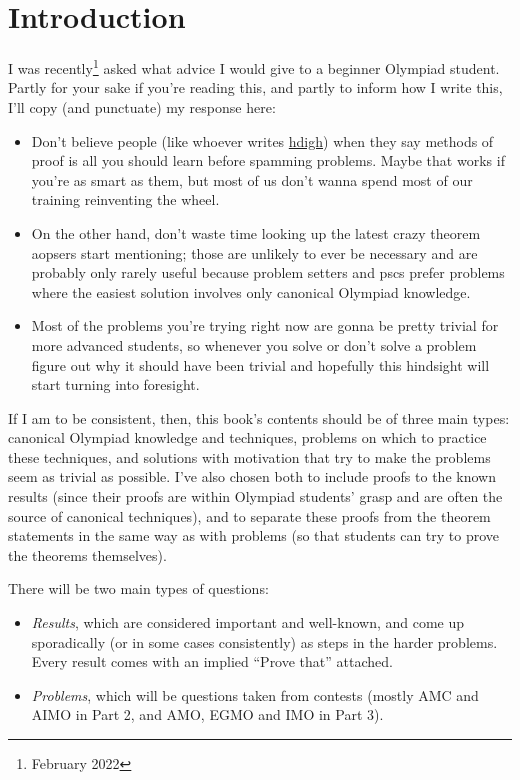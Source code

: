 \chapter*{Introduction}
I was recently\footnote{February 2022} asked what advice I would give to a
beginner Olympiad student. Partly for your sake if you're reading this, and
partly to inform how I write this, I'll copy (and punctuate) my response here:
\begin{itemize}
  \item Don't believe people (like whoever writes
    \href{https://how-did-i-get-here.com/olympiad/}{hdigh}) when they say methods
    of proof is all you should learn before spamming problems. Maybe that works
    if you're as smart as them, but most of us don't wanna spend most of our
    training reinventing the wheel.
  \item On the other hand, don't waste time looking up the latest crazy theorem
    aopsers start mentioning; those are unlikely to ever be necessary and are
    probably only rarely useful because problem setters and pscs prefer problems
    where the easiest solution involves only canonical Olympiad knowledge.
  \item Most of the problems you're trying right now are gonna be pretty
    trivial for more advanced students, so whenever you solve or
    don't solve a problem figure out why it should have been trivial and
    hopefully this hindsight will start turning into foresight.
\end{itemize}

If I am to be consistent, then, this book's contents should be of three main
types: canonical Olympiad knowledge and techniques, problems on which to
practice these techniques, and solutions with motivation that try to make the
problems seem as trivial as possible. I've also chosen both to include proofs to
the known results (since their proofs are within Olympiad students' grasp and
are often the source of canonical techniques), and to separate these proofs from
the theorem statements in the same way as with problems (so that
students can try to prove the theorems themselves). 

There will be two main types of questions:
\begin{itemize}
  \item \emph{Results}, which are considered important and well-known, and come
    up sporadically (or in some cases consistently) as steps in the harder
    problems. Every result comes with an implied ``Prove that'' attached.
  \item \emph{Problems}, which will be questions taken from contests (mostly AMC
    and AIMO in Part 2, and AMO, EGMO and IMO in Part 3).
\end{itemize}

